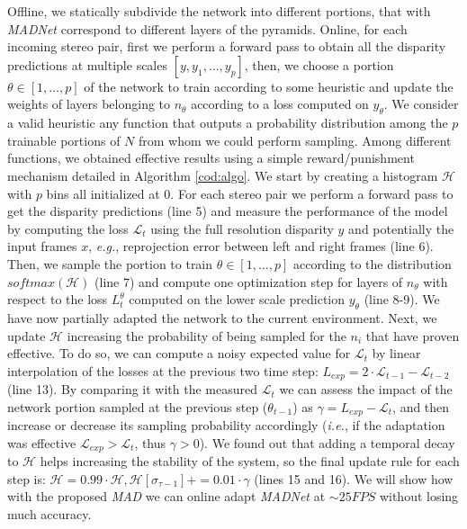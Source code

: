 \documentclass[10pt,twocolumn,letterpaper]{article}
\def\eg{\emph{e.g.}}
\def\ie{\emph{i.e.}}
\def\netname{\emph{MADNet}}
\def\algoname{\emph{MAD}}
\begin{document}
Offline, we statically subdivide the network into different portions, that with \netname{} correspond to different layers of the pyramids. Online, for each incoming stereo pair, first we perform a forward pass to obtain all the disparity predictions at multiple scales $[y,y_1,\dots,y_p]$, then, we choose a portion $\theta \in [1,\dots,p]$ of the network to train according to some heuristic and update the weights of layers belonging to $n_\theta$ according to a loss computed on $y_\theta$. We consider a valid heuristic any function that outputs a probability distribution among the $p$ trainable portions of $N$ from whom we could perform sampling. 
Among different functions, we obtained effective results using a simple reward/punishment mechanism detailed in Algorithm \autoref{cod:algo}. 
We start by creating a histogram $\mathcal{H}$ with $p$ bins all initialized at 0. For each stereo pair we perform a forward pass to get the disparity predictions (line 5) and measure the performance of the model by computing the loss $\mathcal{L}_t$ using the full resolution disparity $y$ and potentially the input frames $x$, \eg, reprojection error between left and right frames \cite{godard2017unsupervised} (line 6). Then, we sample the portion to train $\theta \in [1,\dots,p]$ according to the distribution $softmax(\mathcal{H})$ (line 7) and compute one optimization step for layers of $n_\theta$ with respect to the loss $L^{\theta}_t$ computed on the lower scale prediction $y_\theta$ (line 8-9). We have now partially adapted the network to the current environment. Next, we update $\mathcal{H}$ increasing the probability of being sampled for the $n_i$ that have proven effective. To do so, we can compute a noisy expected value for $\mathcal{L}_t$ by linear interpolation of the losses at the previous two time step: $L_{exp} = 2 \cdot \mathcal{L}_{t-1}-\mathcal{L}_{t-2}$ (line 13). By comparing it with the measured $\mathcal{L}_t$ we can assess the impact of the network portion sampled at the previous step ($\theta_{t-1}$) as $\gamma = L_{exp}-\mathcal{L}_t$, and then increase or decrease its sampling probability accordingly (\ie, if the adaptation was effective $\mathcal{L}_{exp}>\mathcal{L}_{t}$, thus $\gamma>0$). We found out that adding a temporal decay to $\mathcal{H}$ helps increasing the stability of the system, so the final update rule for each step is: $\mathcal{H}=0.99\cdot\mathcal{H}, \mathcal{H}[\sigma_{\tau-1}]+=0.01\cdot\gamma$ (lines 15 and 16). 
We will show how with the proposed \algoname{} we can online adapt \netname{} at $\sim25FPS$ without losing much accuracy.
\end{document}
